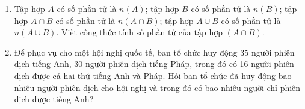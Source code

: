 \begin{bt}%
	\begin{enumerate}
		\item Tập hợp $A$ có số phần tử là $n(A)$; tập hợp $B$ có số phần tử là $n(B)$; tập hợp $A \cap B$ có số phần tử là $n(A \cap B)$; tập hợp $A \cup B$ có số phần tử là $n(A \cup B)$. Viết công thức tính số phần tử của tập hợp $(A \cap B)$.
		\item Để phục vụ cho một hội nghị quốc tế, ban tổ chức huy động 35 người phiên dịch tiếng Anh, 30 người phiên dịch tiếng Pháp, trong đó có 16 người phiên dịch được cả hai thứ tiếng Anh và Pháp. Hỏi ban tổ chức đã huy động bao nhiêu người phiên dịch cho hội nghị và trong đó có bao nhiêu người chỉ phiên dịch được tiếng Anh?
	\end{enumerate}
\end{bt}

